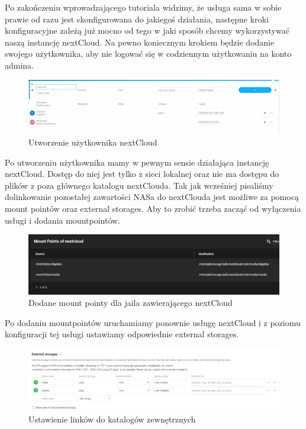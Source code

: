 \documentclass[12pt,a4paper]{article}
\newcommand{\<}{\langle}
\renewcommand{\>}{\rangle}
\theoremstyle{definition}
\begin{document}
Po zakończeniu wprowadzającego tutoriala widzimy, że usługa sama w sobie prawie od razu jest skonfigurowana do jakiegoś działania, następne kroki konfiguracyjne zależą już mocno od tego w jaki sposób chcemy wykorzystywać naszą instancję nextCloud. Na pewno koniecznym krokiem będzie dodanie swojego użytkownika, aby nie logować się w codziennym użytkowaniu na konto admina.

\begin{figure}[H]
    \centering
    \includegraphics[width=\linewidth]{img/ss_cloud/34.png}
    \caption{Utworzenie użytkownika nextCloud}
\end{figure}

Po utworzeniu użytkownika mamy w pewnym sensie działająca instancję nextCloud. Dostęp do niej jest tylko z sieci lokalnej oraz nie ma dostępu do plików z poza głównego katalogu nextClouda. Tak jak wcześniej pisaliśmy dolinkowanie pozostałej zawartości NASa do nextClouda jest możliwe za pomocą mount pointów oraz external storages. Aby to zrobić trzeba zacząć od wyłączenia usługi i dodania mountpointów.

\begin{figure}[H]
    \centering
    \includegraphics[width=\linewidth]{img/ss_cloud/36.png}
    \caption{Dodane mount pointy dla jaila zawierającego nextCloud}
\end{figure}

Po dodaniu mountpointów uruchamiamy ponownie usługę nextCloud i z poziomu konfiguracji tej usługi ustawiamy odpowiednie external storages.

\begin{figure}[H]
    \centering
    \includegraphics[width=\linewidth]{img/ss_cloud/38.png}
    \caption{Ustawienie linków do katalogów zewnętrznych}
\end{figure}
\end{document}
